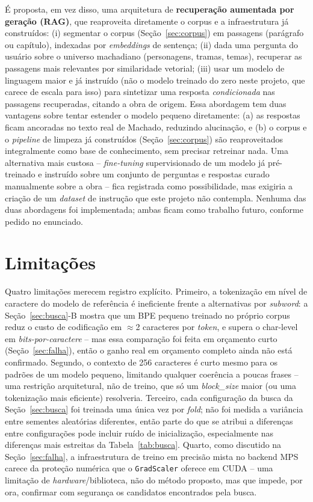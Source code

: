 \documentclass[conference]{IEEEtran}
\begin{document}
É proposta, em vez disso, uma arquitetura de \textbf{recuperação aumentada por
geração (RAG)}, que reaproveita diretamente o corpus e a infraestrutura já
construídos: (i) segmentar o corpus (Seção~\ref{sec:corpus}) em passagens
(parágrafo ou capítulo), indexadas por \textit{embeddings} de sentença; (ii)
dada uma pergunta do usuário sobre o universo machadiano (personagens, tramas,
temas), recuperar as passagens mais relevantes por similaridade vetorial;
(iii) usar um modelo de linguagem maior e já instruído (não o modelo treinado
do zero neste projeto, que carece de escala para isso) para sintetizar uma
resposta \emph{condicionada} nas passagens recuperadas, citando a obra de
origem. Essa abordagem tem duas vantagens sobre tentar estender o modelo
pequeno diretamente: (a) as respostas ficam ancoradas no texto real de
Machado, reduzindo alucinação, e (b) o corpus e o \textit{pipeline} de
limpeza já construídos (Seção~\ref{sec:corpus}) são reaproveitados
integralmente como base de conhecimento, sem precisar retreinar nada. Uma
alternativa mais custosa -- \textit{fine-tuning} supervisionado de um modelo
já pré-treinado e instruído sobre um conjunto de perguntas e respostas
curado manualmente sobre a obra -- fica registrada como possibilidade, mas
exigiria a criação de um \textit{dataset} de instrução que este projeto não
contempla. Nenhuma das duas abordagens foi implementada; ambas ficam como
trabalho futuro, conforme pedido no enunciado.

\section{Limitações}
\label{sec:limitacoes}

Quatro limitações merecem registro explícito. Primeiro, a tokenização em
nível de caractere do modelo de referência é ineficiente frente a
alternativas por \textit{subword}: a Seção~\ref{sec:busca}-B mostra que um
BPE pequeno treinado no próprio corpus reduz o custo de codificação em
$\approx$2 caracteres por \textit{token}, e supera o char-level em
\textit{bits-por-caractere} -- mas essa comparação foi feita em orçamento
curto (Seção~\ref{sec:falha}), então o ganho real em orçamento completo
ainda não está confirmado. Segundo, o contexto de 256 caracteres é curto
mesmo para os padrões de um modelo pequeno, limitando qualquer coerência a
poucas frases -- uma restrição arquitetural, não de treino, que só um
\textit{block\_size} maior (ou uma tokenização mais eficiente) resolveria.
Terceiro, cada configuração da busca da Seção~\ref{sec:busca} foi treinada
uma única vez por \textit{fold}; não foi medida a variância entre sementes
aleatórias diferentes, então parte do que se atribui a diferenças entre
configurações pode incluir ruído de inicialização, especialmente nas
diferenças mais estreitas da Tabela~\ref{tab:busca}. Quarto, como discutido
na Seção~\ref{sec:falha}, a infraestrutura de treino em precisão mista no
backend MPS carece da proteção numérica que o \texttt{GradScaler} oferece em
CUDA -- uma limitação de \textit{hardware}/biblioteca, não do método
proposto, mas que impede, por ora, confirmar com segurança os candidatos
encontrados pela busca.
\end{document}
